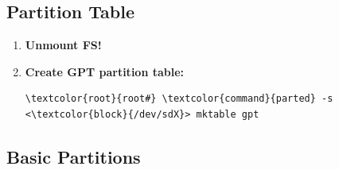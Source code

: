 \documentclass[10pt, a4paper, onecolumn, oneside, titlepage, openany]{book}
\begin{document}
\subsection{Partition Table}
\begin{enumerate}
    \item \textbf{Unmount FS!}
    \item \textbf{Create GPT partition table:}
\begin{Verbatim}[commandchars=\\\{\}]
\textcolor{root}{root#} \textcolor{command}{parted} -s <\textcolor{block}{/dev/sdX}> mktable gpt
\end{Verbatim}
\end{enumerate}
\subsection{Basic Partitions}
\end{document}
